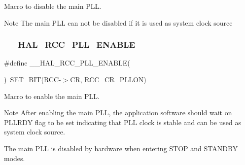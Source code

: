 Macro to disable the main P\+LL. 

\begin{DoxyNote}{Note}
The main P\+LL can not be disabled if it is used as system clock source 
\end{DoxyNote}
\mbox{\label{group___r_c_c___p_l_l___configuration_gaaf196a2df41b0bcbc32745c2b218e696}} 
\subsubsection{\texorpdfstring{\+\_\+\+\_\+\+H\+A\+L\+\_\+\+R\+C\+C\+\_\+\+P\+L\+L\+\_\+\+E\+N\+A\+B\+LE}{\_\_HAL\_RCC\_PLL\_ENABLE}}
{\footnotesize\ttfamily \#define \+\_\+\+\_\+\+H\+A\+L\+\_\+\+R\+C\+C\+\_\+\+P\+L\+L\+\_\+\+E\+N\+A\+B\+LE(\begin{DoxyParamCaption}{ }\end{DoxyParamCaption})~S\+E\+T\+\_\+\+B\+IT(R\+CC-\/$>$CR, \hyperlink{group___peripheral___registers___bits___definition_gad0e73d5b0a4883e074d40029b49ee47e}{R\+C\+C\+\_\+\+C\+R\+\_\+\+P\+L\+L\+ON})}



Macro to enable the main P\+LL. 

\begin{DoxyNote}{Note}
After enabling the main P\+LL, the application software should wait on P\+L\+L\+R\+DY flag to be set indicating that P\+LL clock is stable and can be used as system clock source. 

The main P\+LL is disabled by hardware when entering S\+T\+OP and S\+T\+A\+N\+D\+BY modes. 
\end{DoxyNote}
